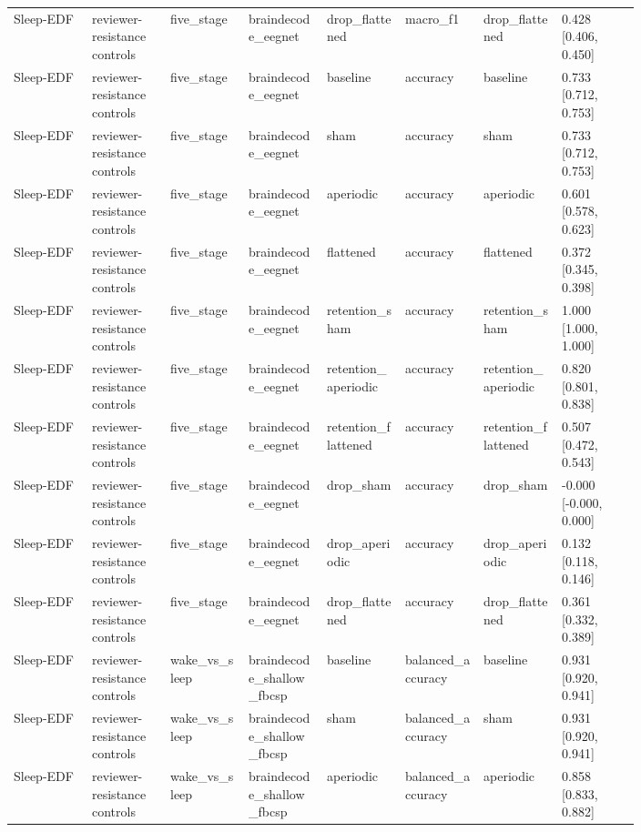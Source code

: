 \begin{longtable}{p{0.10\linewidth}p{0.10\linewidth}p{0.10\linewidth}p{0.10\linewidth}p{0.10\linewidth}p{0.10\linewidth}p{0.10\linewidth}p{0.10\linewidth}}
Sleep-EDF & reviewer-resistance controls & five\_stage & braindecode\_eegnet & drop\_flattened & macro\_f1 & drop\_flattened & 0.428 [0.406, 0.450]\\
Sleep-EDF & reviewer-resistance controls & five\_stage & braindecode\_eegnet & baseline & accuracy & baseline & 0.733 [0.712, 0.753]\\
Sleep-EDF & reviewer-resistance controls & five\_stage & braindecode\_eegnet & sham & accuracy & sham & 0.733 [0.712, 0.753]\\
Sleep-EDF & reviewer-resistance controls & five\_stage & braindecode\_eegnet & aperiodic & accuracy & aperiodic & 0.601 [0.578, 0.623]\\
Sleep-EDF & reviewer-resistance controls & five\_stage & braindecode\_eegnet & flattened & accuracy & flattened & 0.372 [0.345, 0.398]\\
Sleep-EDF & reviewer-resistance controls & five\_stage & braindecode\_eegnet & retention\_sham & accuracy & retention\_sham & 1.000 [1.000, 1.000]\\
Sleep-EDF & reviewer-resistance controls & five\_stage & braindecode\_eegnet & retention\_aperiodic & accuracy & retention\_aperiodic & 0.820 [0.801, 0.838]\\
Sleep-EDF & reviewer-resistance controls & five\_stage & braindecode\_eegnet & retention\_flattened & accuracy & retention\_flattened & 0.507 [0.472, 0.543]\\
Sleep-EDF & reviewer-resistance controls & five\_stage & braindecode\_eegnet & drop\_sham & accuracy & drop\_sham & -0.000 [-0.000, 0.000]\\
Sleep-EDF & reviewer-resistance controls & five\_stage & braindecode\_eegnet & drop\_aperiodic & accuracy & drop\_aperiodic & 0.132 [0.118, 0.146]\\
Sleep-EDF & reviewer-resistance controls & five\_stage & braindecode\_eegnet & drop\_flattened & accuracy & drop\_flattened & 0.361 [0.332, 0.389]\\
Sleep-EDF & reviewer-resistance controls & wake\_vs\_sleep & braindecode\_shallow\_fbcsp & baseline & balanced\_accuracy & baseline & 0.931 [0.920, 0.941]\\
Sleep-EDF & reviewer-resistance controls & wake\_vs\_sleep & braindecode\_shallow\_fbcsp & sham & balanced\_accuracy & sham & 0.931 [0.920, 0.941]\\
Sleep-EDF & reviewer-resistance controls & wake\_vs\_sleep & braindecode\_shallow\_fbcsp & aperiodic & balanced\_accuracy & aperiodic & 0.858 [0.833, 0.882]\\

\end{longtable}
